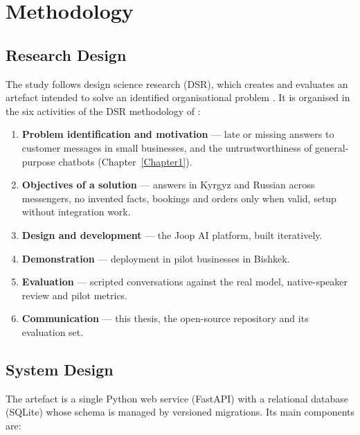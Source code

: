 
\chapter{Methodology} %

\label{Chapter3}


\section{Research Design}

The study follows design science research (DSR), which creates and evaluates an artefact intended to solve an identified
organisational problem \parencite{hevner2004design}. It is organised in the six activities of the DSR methodology of
\textcite{peffers2007design}:

\begin{enumerate}
	\item \textbf{Problem identification and motivation} --- late or missing answers to customer messages in small
	businesses, and the untrustworthiness of general-purpose chatbots (Chapter~\ref{Chapter1}).
	\item \textbf{Objectives of a solution} --- answers in Kyrgyz and Russian across messengers, no invented facts,
	bookings and orders only when valid, setup without integration work.
	\item \textbf{Design and development} --- the Joop AI platform, built iteratively.
	\item \textbf{Demonstration} --- deployment in pilot businesses in Bishkek.
	\item \textbf{Evaluation} --- scripted conversations against the real model, native-speaker review and pilot metrics.
	\item \textbf{Communication} --- this thesis, the open-source repository and its evaluation set.
\end{enumerate}

\section{System Design}

The artefact is a single Python web service (FastAPI) with a relational database (SQLite) whose schema is managed by
versioned migrations. Its main components are:

